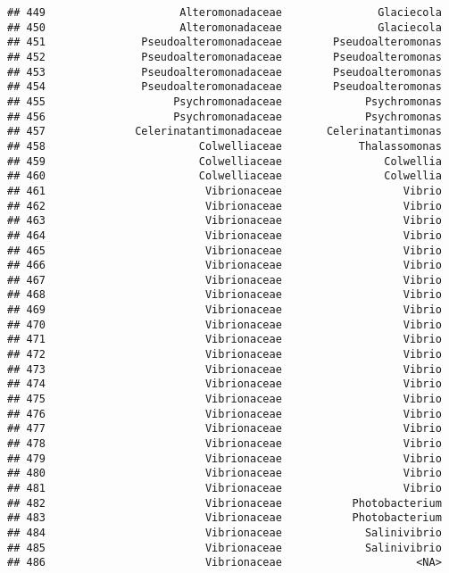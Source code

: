 \documentclass[
]{article}
\begin{document}
\begin{verbatim}
## 449                     Alteromonadaceae               Glaciecola
## 450                     Alteromonadaceae               Glaciecola
## 451               Pseudoalteromonadaceae        Pseudoalteromonas
## 452               Pseudoalteromonadaceae        Pseudoalteromonas
## 453               Pseudoalteromonadaceae        Pseudoalteromonas
## 454               Pseudoalteromonadaceae        Pseudoalteromonas
## 455                    Psychromonadaceae             Psychromonas
## 456                    Psychromonadaceae             Psychromonas
## 457              Celerinatantimonadaceae       Celerinatantimonas
## 458                        Colwelliaceae            Thalassomonas
## 459                        Colwelliaceae                Colwellia
## 460                        Colwelliaceae                Colwellia
## 461                         Vibrionaceae                   Vibrio
## 462                         Vibrionaceae                   Vibrio
## 463                         Vibrionaceae                   Vibrio
## 464                         Vibrionaceae                   Vibrio
## 465                         Vibrionaceae                   Vibrio
## 466                         Vibrionaceae                   Vibrio
## 467                         Vibrionaceae                   Vibrio
## 468                         Vibrionaceae                   Vibrio
## 469                         Vibrionaceae                   Vibrio
## 470                         Vibrionaceae                   Vibrio
## 471                         Vibrionaceae                   Vibrio
## 472                         Vibrionaceae                   Vibrio
## 473                         Vibrionaceae                   Vibrio
## 474                         Vibrionaceae                   Vibrio
## 475                         Vibrionaceae                   Vibrio
## 476                         Vibrionaceae                   Vibrio
## 477                         Vibrionaceae                   Vibrio
## 478                         Vibrionaceae                   Vibrio
## 479                         Vibrionaceae                   Vibrio
## 480                         Vibrionaceae                   Vibrio
## 481                         Vibrionaceae                   Vibrio
## 482                         Vibrionaceae           Photobacterium
## 483                         Vibrionaceae           Photobacterium
## 484                         Vibrionaceae             Salinivibrio
## 485                         Vibrionaceae             Salinivibrio
## 486                         Vibrionaceae                     <NA>

\end{verbatim}
\end{document}
